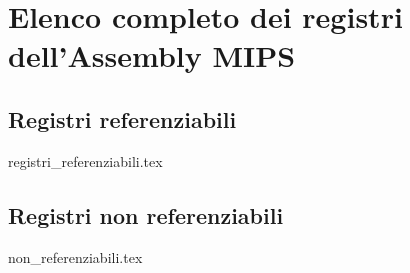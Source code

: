 \section*{Elenco completo dei registri dell'Assembly MIPS}
\subsection*{Registri referenziabili}
\begin{table}[H]
	\centering
	{registri_referenziabili.tex}
\end{table}
\subsection*{Registri non referenziabili}
\begin{table}[H]
	\centering
	{non_referenziabili.tex}
\end{table}


